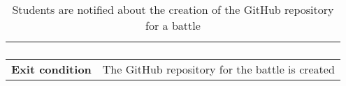 \begin{enumerate}[label=\textbf{UC\arabic*}:,leftmargin=1.3cm]
\begin{table}[H]
\begin{tabular}{|l|p{11.9cm}|}
\begin{enumerate}[label=\arabic*.]
                        \end{enumerate}                        \\\hline
                        \textbf{Exit condition}  & The GitHub repository for the battle is created                                                          \\\hline
                  \end{tabular}
                  \caption{Students are notified about the creation of the GitHub repository for a battle  }
                  \label{table:Students are notified about the creation of the GitHub repository for a battle}
            \end{table}


\end{enumerate}
